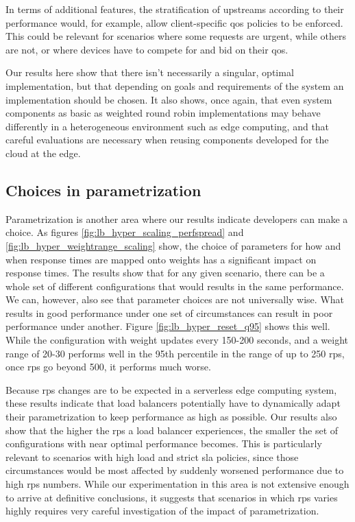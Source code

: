 \documentclass[draft,final]{vutinfth} %
\begin{document}
In terms of additional features, the stratification of upstreams according to their performance would, for example, allow client-specific \gls{qos} policies to be enforced.
This could be relevant for scenarios where some requests are urgent, while others are not, or where devices have to compete for and bid on their \gls{qos}.

Our results here show that there isn't necessarily a singular, optimal implementation, but that depending on goals and requirements of the system an implementation should be chosen.
It also shows, once again, that even system components as basic as weighted round robin implementations may behave differently in a heterogeneous environment such as edge computing, and that careful evaluations are necessary when reusing components developed for the cloud at the edge.

\subsection{Choices in parametrization}
Parametrization is another area where our results indicate developers can make a choice.
As figures \ref{fig:lb_hyper_scaling_perfspread} and \ref{fig:lb_hyper_weightrange_scaling} show, the choice of parameters for how and when response times are mapped onto weights has a significant impact on response times.
The results show that for any given scenario, there can be a whole set of different configurations that would results in the same performance.
We can, however, also see that parameter choices are not universally wise.
What results in good performance under one set of circumstances can result in poor performance under another.
Figure \ref{fig:lb_hyper_reset_q95} shows this well.
While the configuration with weight updates every 150-200 seconds, and a weight range of 20-30 performs well in the 95th percentile in the range of up to 250 \gls{rps}, once \gls{rps} go beyond 500, it performs much worse.

Because \gls{rps} changes are to be expected in a serverless edge computing system, these results indicate that load balancers potentially have to dynamically adapt their parametrization to keep performance as high as possible.
Our results also show that the higher the \gls{rps} a load balancer experiences, the smaller the set of configurations with near optimal performance becomes.
This is particularly relevant to scenarios with high load and strict \gls{sla} policies, since those circumstances would be most affected by suddenly worsened performance due to high \gls{rps} numbers.
While our experimentation in this area is not extensive enough to arrive at definitive conclusions, it suggests that scenarios in which \gls{rps} varies highly requires very careful investigation of the impact of parametrization.
\end{document}
